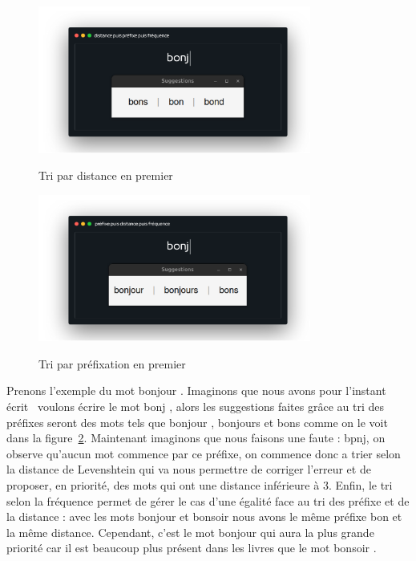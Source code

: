 \documentclass[a4paper, 11pt]{report}
\begin{document}
{\begin{figure}[H]
	\begin{center}
		{\includegraphics[width=0.8\textwidth]{images/sugg_distance.png}}
	\end{center}
	\caption{Tri par distance en premier}
	\label{fig:tri_dist}
\end{figure}
\begin{figure}[H]
	\begin{center}
		{\includegraphics[width=0.8\textwidth]{images/sugg_prefixe.png}}
	\end{center}
	\caption{Tri par préfixation en premier}
	\label{fig:tri_prefixe}
\end{figure}

Prenons l'exemple du mot \og{} bonjour \fg{}. Imaginons que nous avons pour l'instant écrit \ voulons écrire le mot \og{} bonj \fg{}, alors les suggestions faites grâce au tri des préfixes seront des mots tels que \og{} bonjour \fg{}, \og{} bonjours \fg{} et \og{} bons \fg{} comme on le voit dans la figure~\ref{fig:tri_prefixe}.
Maintenant imaginons que nous faisons une faute : \og{} bpnj\fg{}, on observe qu'aucun mot commence par ce préfixe, on commence donc a trier selon la distance de Levenshtein qui va nous permettre de corriger l'erreur et de proposer, en priorité, des mots qui ont une distance inférieure à 3. Enfin, le tri selon la fréquence permet de gérer le cas d'une égalité face au tri des préfixe et de la distance : avec les mots \og{} bonjour \fg{} et \og{} bonsoir \fg{}  nous avons le même préfixe\og{} bon \fg{} et la même distance. Cependant, c'est le mot \og{} bonjour \fg{} qui aura la plus grande priorité car il est beaucoup plus présent dans les livres que le mot \og{} bonsoir \fg{}.\\

}
\end{document}

